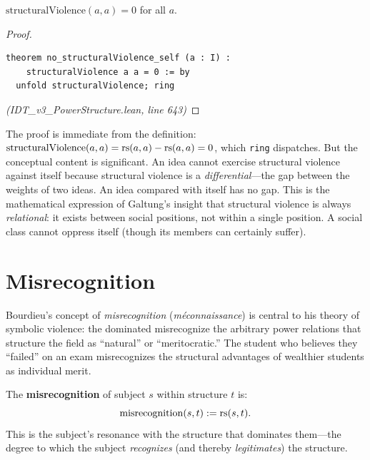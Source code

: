 \begin{theorem}
\label{thm:no-self-violence}
$\mathrm{structuralViolence}(a, a) = 0$ for all $a$.
\end{theorem}

\begin{proof}
\begin{lstlisting}
theorem no_structuralViolence_self (a : I) :
    structuralViolence a a = 0 := by
  unfold structuralViolence; ring
\end{lstlisting}
\textit{(IDT\_v3\_PowerStructure.lean, line 643)}
\end{proof}

\begin{remark}
The proof is immediate from the definition: $\mathrm{structuralViolence}(a,a)
= \mathrm{rs}(a,a) - \mathrm{rs}(a,a) = 0$, which \texttt{ring} dispatches. But the
conceptual content is significant. An idea cannot exercise structural violence
against itself because structural violence is a \emph{differential}---the
gap between the weights of two ideas. An idea compared with itself has no gap.
This is the mathematical expression of Galtung's insight that structural
violence is always \emph{relational}: it exists between social positions, not
within a single position. A social class cannot oppress itself (though its
members can certainly suffer).
\end{remark}

\section{Misrecognition}

Bourdieu's concept of \emph{misrecognition} (\emph{méconnaissance}) is central
to his theory of symbolic violence: the dominated misrecognize the arbitrary
power relations that structure the field as ``natural'' or ``meritocratic.''
The student who believes they ``failed'' on an exam misrecognizes the
structural advantages of wealthier students as individual merit.

\begin{definition}[Misrecognition]
\label{def:misrecognition}
The \textbf{misrecognition} of subject $s$ within structure $t$ is:
\[
  \mathrm{misrecognition}(s, t) := \mathrm{rs}(s, t).
\]
This is the subject's resonance with the structure that dominates them---the
degree to which the subject \emph{recognizes} (and thereby \emph{legitimates})
the structure.
\end{definition}

